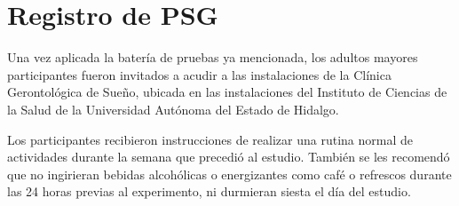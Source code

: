 
\section{Registro de PSG}

Una vez aplicada
la bater\'ia de pruebas ya mencionada, los adultos mayores
participantes fueron invitados a acudir a las instalaciones de la Cl\'inica Gerontol\'ogica de 
Sue\~no, ubicada en las instalaciones del Instituto de Ciencias de la Salud de la Universidad 
Aut\'onoma del Estado de Hidalgo.

Los participantes recibieron instrucciones de realizar una rutina normal de actividades durante la 
semana que precedi\'o al estudio. Tambi\'en se les recomend\'o que no ingirieran bebidas 
alcoh\'olicas o energizantes como caf\'e o refrescos durante las 24 horas previas al experimento, 
ni durmieran siesta el d\'ia del estudio. 


